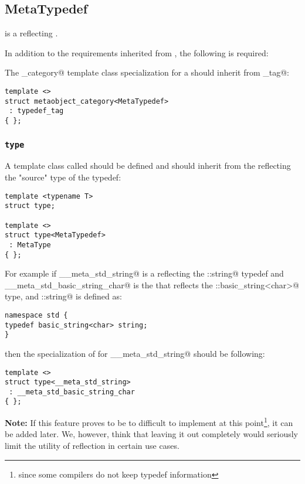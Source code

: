 \subsection{MetaTypedef}
\label{concept-MetaTypedef}

 is a  reflecting \verb@typedef@s.

In addition to the requirements inherited from , the following is required:

The \verb@metaobject_category@ template class specialization for a  should
inherit from \verb@typedef_tag@:

\begin{verbatim}
template <>
struct metaobject_category<MetaTypedef>
 : typedef_tag
{ };
\end{verbatim}

\subsubsection{\texttt{type}}

A template class called \verb@type@ should be defined and should inherit from the 
reflecting the "source" type of the typedef:

\begin{verbatim}
template <typename T>
struct type;

template <>
struct type<MetaTypedef>
 : MetaType
{ };
\end{verbatim}

For example if \verb@__meta_std_string@ is a  reflecting the \verb@std::string@
typedef and \verb@__meta_std_basic_string_char@ is the  that reflects
the \verb@std::basic_string<char>@ type, and \verb@std::string@ is defined as:

\begin{verbatim}
namespace std {
typedef basic_string<char> string;
}
\end{verbatim}

then the specialization of \verb@type@ for \verb@__meta_std_string@ should be following:

\begin{verbatim}
template <>
struct type<__meta_std_string>
 : __meta_std_basic_string_char
{ };
\end{verbatim}

\textbf{Note:} If this feature proves to be to difficult to implement 
at this point\footnote{since some compilers do not keep typedef information},
it can be added later. We, however, think that leaving it out completely would
seriously limit the utility of reflection in certain use cases.
